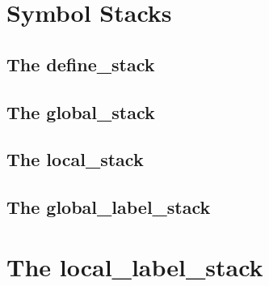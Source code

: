 \section{Symbol Stacks}

\subsection{The define\_stack}

\subsection{The global\_stack}

\subsection{The local\_stack}

\subsection{The global\_label\_stack}

\section{The local\_label\_stack}




